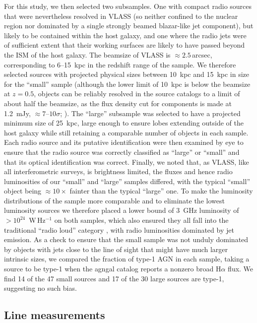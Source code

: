 \documentclass[linenumbers,trackchanges]{aastex701}
\begin{document}
For this study, we then selected two subsamples. One with compact radio sources that were nevertheless resolved in VLASS (so neither confined to the nuclear region nor dominated by a single strongly beamed blazar-like jet component), but likely to be contained within the host galaxy, and one where the radio jets were of sufficient extent that their working surfaces are likely to have passed beyond the ISM of the host galaxy. The beamsize of VLASS is $\approx 2.5$\,arcsec, corresponding to 6--15~kpc in the redshift range of the sample. We therefore selected sources with projected physical sizes between 10~kpc and 15~kpc in size for the ``small'' sample (although the lower limit of 10~kpc is below the beamsize at $z=0.5$, objects can be reliably resolved in the source catalogs to a limit of about half the beamsize, as the flux density cut for components is made at 1.2~mJy, $\approx 7$--$10\sigma$; \citet{kimball26}). The ``large'' subsample was selected to have a projected minimum size of 25~kpc, large enough to ensure lobes extending outside of the host galaxy while still retaining a comparable number of objects in each sample. Each radio source and its putative identification were then examined by eye to ensure that the radio source was correctly classified as ``large'' or ``small'' and that its optical identification was correct. 
Finally, we noted that, as VLASS, like all interferometric surveys, is brightness limited, the fluxes and hence radio luminosities of our ``small'' and ``large'' samples differed, with the typical ``small'' object being $\approx 10\times$ fainter than the typical ``large'' one. To make the luminosity distributions of the sample more comparable and to eliminate the lowest luminosity sources we therefore placed a lower bound of 3~GHz luminosity of $>10^{24}$~W\,Hz$^{-1}$ on both samples, which also ensured they all fall into the traditional ``radio loud'' category \citep[e.g.][]{miller90}, with radio luminosities dominated by jet emission. As a check to ensure that the small sample was not unduly dominated by objects with jets close to the line of sight that might have much larger intrinsic sizes, we compared the fraction of type-1 AGN in each sample, taking a source to be type-1 when the {\sc agngal} catalog reports a nonzero broad H$\alpha$ flux. We find 14 of the 47 small sources and 17 of the 30 large sources are type-1, suggesting no such bias.

\subsection{Line measurements}
\end{document}
